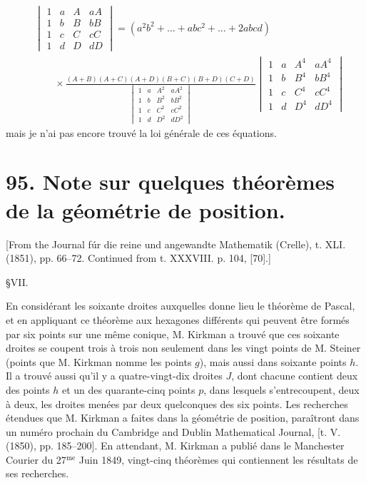 \documentclass[11pt,a4paper]{book}
\begin{document}
\begin{align*}
&\begin{vmatrix}
1 & a & A & aA \\
1 & b & B & bB \\
1 & c & C & cC \\
1 & d & D & dD
\end{vmatrix}
= (a^2b^2 + \ldots + abc^2 + \ldots + 2abcd) \\
&\qquad \times \frac{(A + B)(A + C)(A + D)(B + C)(B + D)(C + D)}
{\begin{vmatrix}
1 & a & A^2 & aA^2 \\
1 & b & B^2 & bB^2 \\
1 & c & C^2 & cC^2 \\
1 & d & D^2 & dD^2
\end{vmatrix}}
\begin{vmatrix}
1 & a & A^4 & aA^4 \\
1 & b & B^4 & bB^4 \\
1 & c & C^4 & cC^4 \\
1 & d & D^4 & dD^4
\end{vmatrix}
\end{align*}
mais je n'ai pas encore trouv\'{e} la loi g\'{e}n\'{e}rale de ces \'{e}quations.

\newpage

\section*{95. Note sur quelques th\'{e}or\`{e}mes de la g\'{e}om\'{e}trie de position.}

[From the Journal f\'{u}r die reine und angewandte Mathematik (Crelle), t. XLI. (1851), pp. 66--72. Continued from t. XXXVIII. p. 104, [70].]

\S VII.

En consid\'{e}rant les soixante droites auxquelles donne lieu le th\'{e}or\`{e}me de Pascal, et en appliquant ce th\'{e}or\`{e}me aux hexagones diff\'{e}rents qui peuvent \^{e}tre form\'{e}s par six points sur une m\^{e}me conique, M. Kirkman a trouv\'{e} que ces soixante droites se coupent trois \`{a} trois non seulement dans les vingt points de M. Steiner (points que M. Kirkman nomme les points $g$), mais aussi dans soixante points $h$. Il a trouv\'{e} aussi qu'il y a quatre-vingt-dix droites $J$, dont chacune contient deux des points $h$ et un des quarante-cinq points $p$, dans lesquels s'entrecoupent, deux \`{a} deux, les droites men\'{e}es par deux quelconques des six points. Les recherches \'{e}tendues que M. Kirkman a faites dans la g\'{e}om\'{e}trie de position, para\^{i}tront dans un num\'{e}ro prochain du Cambridge and Dublin Mathematical Journal, [t. V. (1850), pp. 185--200]. En attendant, M. Kirkman a publi\'{e} dans le Manchester Courier du 27$^{\text{me}}$ Juin 1849, vingt-cinq th\'{e}or\`{e}mes qui contiennent les r\'{e}sultats de ses recherches.
\end{document}
